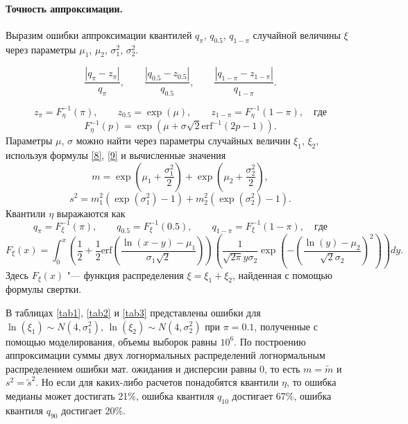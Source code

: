 \documentclass[12pt]{article}
\begin{document}
	\paragraph{Точность аппроксимации.}
	
	Выразим ошибки аппроксимации квантилей $q_{\pi}$, $q_{0.5}$, $q_{1-\pi}$ случайной величины $\xi$ через параметры $\mu_{1}$, $\mu_{2}$, $\sigma_{1}^{2}$, $\sigma_{2}^{2}$.
	
	\[\dfrac{\left| q_{\pi} - z_{\pi}\right|}{q_{\pi}}, \quad\quad \dfrac{\left| q_{0.5} - z_{0.5}\right|}{q_{0.5}}, \quad\quad \dfrac{\left| q_{1-\pi} - z_{1-\pi}\right|}{q_{1-\pi}}.\]
	
	\[z_{\pi} = F_{\eta}^{-1}(\pi), \quad\quad z_{0.5} = \exp(\mu), \quad\quad z_{1-\pi} = F_{\eta}^{-1}(1-\pi), \quad где\]
	\[F_{\eta}^{-1}(p) = \exp(\mu+\sigma\sqrt{2}\mathrm{erf}^{-1}(2p-1)).\]
	Параметры $\mu$, $\sigma$ можно найти через параметры случайных величин $\xi_{1}$, $\xi_{2}$, используя формулы \eqref{8}, \eqref{9} и вычисленные значения
	\[m = \exp\left( \mu_{1}+\frac{\sigma_{1}^{2}}{2}\right) + \exp\left( \mu_{2}+\frac{\sigma_{2} ^{2}}{2}\right),\]
	\[s^{2} = m_{1}^{2}(\exp(\sigma_{1}^{2})-1)+m_{2}^{2}(\exp(\sigma_{2}^{2})-1).\]
	Квантили $\eta$ выражаются как
	\[q_{\pi} = F_{\xi}^{-1}(\pi), \quad\quad q_{0.5} = F_{\xi}^{-1}(0.5), \quad\quad q_{1-\pi} = F_{\xi}^{-1}(1-\pi), \quad где\]
	\[F_{\xi}(x) = \int_{0}^{x}\left( \dfrac{1}{2}+\dfrac{1}{2} \mathrm{erf}\left( \dfrac{\ln(x-y)-\mu_{1}}{\sigma_{1}\sqrt{2}}\right) \right) \left( \dfrac{1}{\sqrt{2\pi}y\sigma_{2}}\exp\left( -\left( \dfrac{\ln(y)-\mu_{2}}{\sqrt{2}\sigma_{2}}\right) ^{2}\right) \right) dy. \]
	Здесь $F_{\xi}(x)$ "--- функция распределения $\xi = \xi_{1}+\xi_{2}$, найденная с помощью формулы свертки.
	
	В таблицах \ref{tab1}, \ref{tab2} и \ref{tab3} представлены ошибки для $\ln(\xi_{1}) \sim N(4, \sigma _{1}^{2})$, $\ln(\xi_{2}) \sim N(4, \sigma_{2}^{2})$ при $\pi=0.1$, полученные с помощью моделирования, объемы выборок равны $10^{6}$. По построению аппроксимации суммы двух логнормальных распределений логнормальным распределением ошибки мат. ожидания и дисперсии равны 0, то есть $m=\tilde{m}$ и $s^{2} = \tilde{s}^{2}$. Но если для каких-либо расчетов понадобятся квантили $\eta$, то ошибка медианы может достигать 21\%, ошибка  квантиля $q_{10}$ достигает 67\%, ошибка квантиля $q_{90}$ достигает 20\%.
	
	
\end{document}
